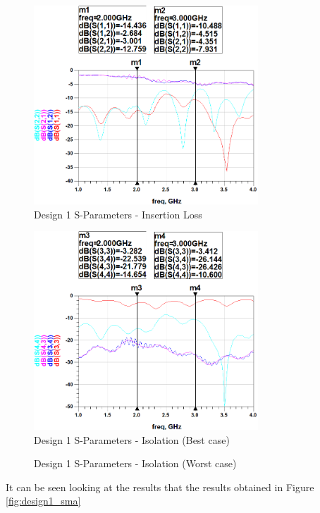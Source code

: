 \documentclass[12pt,openany,a4paper]{book}
\begin{document}
\begin{figure}[H]
	\centering
	\includegraphics[width=0.75\textwidth]{Design1-1.png}
	\caption{Design 1 S-Parameters - Insertion Loss}
	\label{fig:design1_1}
\end{figure} 
\begin{figure}[H]
	\centering
	\includegraphics[width=0.75\textwidth]{Design1-2.png}
	\caption{Design 1 S-Parameters - Isolation (Best case)}
	\label{fig:design1_2}
\end{figure} 
\begin{figure}[H]
	\centering
	\caption{Design 1 S-Parameters - Isolation (Worst case)}
	\label{fig:design1_3}
\end{figure} 

It can be seen looking at the results that the results obtained in Figure \ref{fig:design1_sma}
\end{document}

